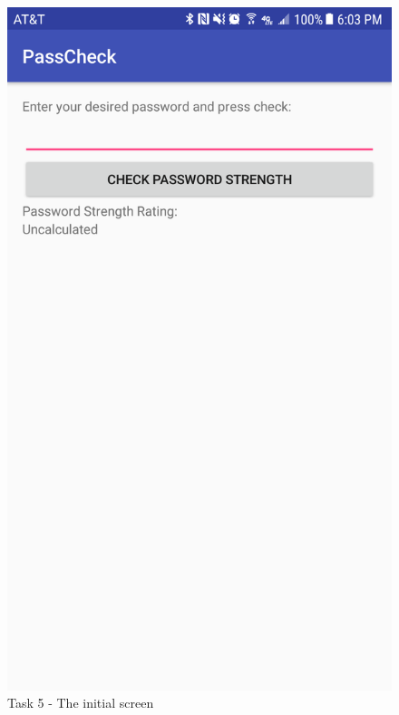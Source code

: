 \documentclass{article}
\makeatletter
\def\maxwidth#1{\ifdim\Gin@nat@width>#1 #1\else\Gin@nat@width\fi}
\makeatother
\begin{document}
    \begin{figure}[ht]
		\includegraphics[width=\maxwidth{3in}]{img/t5s1.png}
		\centering
		\caption{Task 5 - The initial screen}
	\end{figure}
\end{document}
